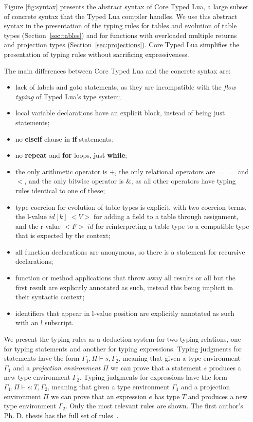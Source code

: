 \documentclass[10pt]{sigplanconf}
\newcommand{\env}{\Gamma}
\newcommand{\penv}{\Pi}
\begin{document}
Figure \ref{fig:syntax} presents the abstract syntax of 
Core Typed Lua, a large subset of concrete syntax
that the Typed Lua compiler handles. We use this abstract
syntax in the presentation of the typing rules
for tables and evolution of table types (Section~\ref{sec:tables})
and for functions with overloaded multiple returns and
projection types (Section~\ref{sec:projections}).
Core Typed Lua simplifies the presentation of typing rules
without sacrificing expressiveness.

The main differences between Core Typed Lua and the concrete
syntax are:
\begin{itemize}
\item lack of labels and goto statements, as they are incompatible
with the {\em flow typing} of Typed Lua's type system;
\item local variable declarations have an explicit block,
instead of being just statements;
\item no {\bf elseif} clause in {\bf if} statements;
\item no {\bf repeat} and {\bf for} loops, just {\bf while};
\item the only arithmetic operator is $+$, the only relational
operators are $==$ and $<$, and the only bitwise operator
is $\&$, as all other operators have typing rules identical to
one of these;
\item type coercion for evolution of table types is explicit,
with two coercion terms, the l-value $id[k] \; {<}V{>}$ for adding a field to 
a table through assignment, and the r-value ${<}F{>} \;id$ for reinterpreting
a table type to a compatible type that is expected by the context;
\item all function declarations are anonymous, so there is a
statement for recursive declarations;
\item function or method applications that throw away all
results or all but the first result are explicitly annotated
as such, instead this being implicit in their syntactic context;
\item identifiers that appear in l-value position are explicitly
annotated as such with an $l$ subscript.
\end{itemize}

We present the typing rules as a deduction system for two typing relations, one for typing statements and another for typing expressions. Typing judgments for statements have the form $\env_{1}, \penv \vdash s, \env_{2}$, meaning that
given a type environment $\env_{1}$ and a {\em projection environment} $\penv$ we can prove that a statement $s$ produces a new type environment $\env_{2}$. Typing judgments for
expressions have the form $\env_{1}, \penv \vdash e : T, \env_{2}$, meaning that given a type environment $\env_{1}$
and a projection environment $\penv$ we can prove that an expression $e$ has type $T$ and produces a new type environment $\env_{2}$.
Only the most relevant rules are shown. The first author's Ph. D. thesis has the full set of rules~\cite{maidl2015tl}.
\end{document}
